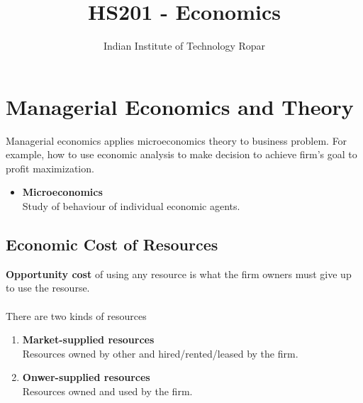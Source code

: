 \documentclass[oneside]{book}
\title{HS201 - Economics}
\author{Indian Institute of Technology Ropar}
\begin{document}
\maketitle
{
	\hypersetup{
		hidelinks
	}
	\tableofcontents
}
\renewcommand{\arraystretch}{1.5}%

\chapter{Managerial Economics and Theory}
Managerial economics applies microeconomics theory to business problem. For example, how to use economic analysis to make decision to achieve firm's goal to profit maximization.
\begin{itemize}
	\item \textbf{Microeconomics}\\
	      Study of behaviour of individual economic agents.
\end{itemize}
\section{Economic Cost of Resources}
\textbf{Opportunity cost} of using any resource is what the firm owners must give up to use the resourse.
\\\\
\noindent There are two kinds of resources
\begin{enumerate}
	\item \textbf{Market-supplied resources}\\
	      Resources owned by other and hired/rented/leased by the firm.
	\item \textbf{Onwer-supplied resources}\\
	      Resources owned and used by the firm.
\end{enumerate}
\end{document}

